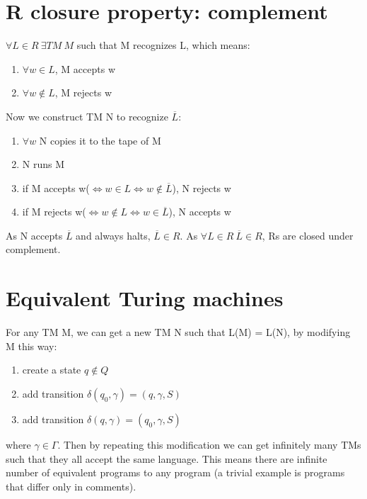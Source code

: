 \documentclass{article}
\begin{document}
\section{R closure property: complement}
$\forall L \in R \ \exists TM \ M$ such that M recognizes L, which means:
\begin{enumerate}
  \item $\forall w \in L$, M accepts w
  \item $\forall w \notin L$, M rejects w
\end{enumerate}
Now we construct TM N to recognize $\overline{L}$:
\begin{enumerate}
  \item $\forall w$ N copies it to the tape of M
  \item N runs M
  \item if M accepts w($\iff w \in L \iff w \notin \overline{L}$), N rejects w
  \item if M rejects w($\iff w \notin L \iff w \in \overline{L}$), N accepts w
\end{enumerate}
As N accepts $\overline{L}$ and always halts, $\overline{L} \in R$. As $\forall
L \in R \ \overline{L} \in R$, Rs are closed under complement.

\section{Equivalent Turing machines}
For any TM M, we can get a new TM N such that L(M) = L(N), by modifying M this
way:
\begin{enumerate}
  \item create a state $q \notin Q$
  \item add transition $\delta(q_0, \gamma) = (q, \gamma, S)$
  \item add transition $\delta(q, \gamma) = (q_0, \gamma, S)$
\end{enumerate}
where $\gamma \in \Gamma$. Then by repeating this modification we can get
infinitely many TMs such that they all accept the same language. This means
there are infinite number of equivalent programs to any program (a trivial
example is programs that differ only in comments).
\end{document}

